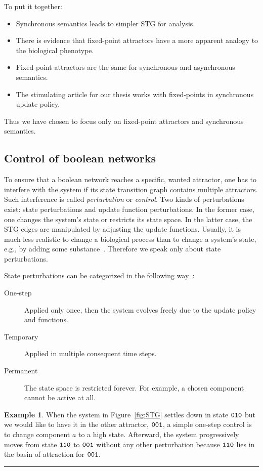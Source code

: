 \documentclass[
	digital, oneside, nosansbold, nocolorbold, nolot, nolof
]{fithesis4}
\theoremstyle{definition}
\theoremstyle{definition}
\newtheorem{example}{Example}
\newenvironment{lexample}
    {\begin{example}}
    {\par\hspace{\stretch{1}}\rule{0.2\textwidth}{0.01ex}\hspace{\stretch{1}}
     \par\end{example}}
\begin{document}
To put it together:
\begin{itemize}
    \item Synchronous semantics leads to simpler STG for analysis.
    \item There is evidence that fixed-point attractors have a more apparent
        analogy to the biological phenotype.
    \item Fixed-point attractors are the same for synchronous and asynchronous
        semantics.
    \item The stimulating article for our thesis works with fixed-points in
        synchronous update policy.
\end{itemize}
Thus we have chosen to focus only on fixed-point attractors and synchronous
semantics.

\subsection{Control of boolean networks}

To ensure that a boolean network reaches a specific, wanted attractor, one has
to interfere with the system if its state transition graph contains multiple
attractors. Such interference is called \emph{perturbation} or \emph{control}.
Two kinds of perturbations exist: state perturbations and update function
perturbations. In the former case, one changes the system's state or restricts
its state space. In the latter case, the STG edges are manipulated by adjusting
the update functions. Usually, it is much less realistic to change a biological
process than to change a system's state, e.g., by adding some
substance~\cite{zanudo}. Therefore we speak only about state perturbations.

State perturbations can be categorized in the following
way~\cite{smijakova_thesis}:
\begin{description}
    \item[One-step] Applied only once, then the system evolves freely due to
        the update policy and functions.
    \item[Temporary] Applied in multiple consequent time steps.
    \item[Permanent] The state space is restricted forever. For example, a
        chosen component cannot be active at all.
\end{description}

\begin{lexample}
When the system in Figure~\ref{fig:STG} settles down in state $\mathtt{010}$
but we would like to have it in the other attractor, $\mathtt{001}$, a
simple one-step control is to change component $a$ to a high state.
Afterward, the system progressively moves from state $\mathtt{110}$ to
$\mathtt{001}$ without any other perturbation because $\mathtt{110}$ lies
in the basin of attraction for $\mathtt{001}$.
\end{lexample}
\end{document}
